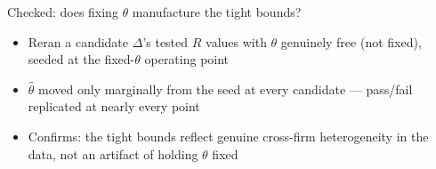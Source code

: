 \documentclass[
  ignorenonframetext,
  aspectratio=169,
]{beamer}
\providecommand{\tightlist}{%
  \setlength{\itemsep}{0pt}\setlength{\parskip}{0pt}}
\begin{document}
\begin{frame}{Checked: does fixing \(\theta\) manufacture the tight
bounds?}
\protect{}\label{sec-counterfactual-robustness}
\footnotesize

\begin{itemize}
\tightlist
\item
  Reran a candidate \(\Delta\)'s tested \(R\) values with \(\theta\)
  genuinely free (not fixed), seeded at the fixed-\(\theta\) operating
  point
\item
  \(\hat\theta\) moved only marginally from the seed at every candidate
  --- pass/fail replicated at nearly every point
\item
  Confirms: the tight bounds reflect genuine cross-firm heterogeneity in
  the data, not an artifact of holding \(\theta\) fixed
\end{itemize}
\end{frame}
\end{document}
